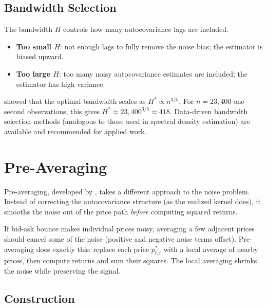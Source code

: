 \subsection{Bandwidth Selection}

The bandwidth $H$ controls how many autocovariance lags are included.
\begin{itemize}[nosep]
  \item \textbf{Too small $H$}: not enough lags to fully remove the noise bias; the estimator is biased upward.
  \item \textbf{Too large $H$}: too many noisy autocovariance estimates are included; the estimator has high variance.
\end{itemize}

\citet{BNHLS2008} showed that the optimal bandwidth scales as $H^* \propto n^{3/5}$.
For $n = 23{,}400$ one-second observations, this gives $H^* \approx 23{,}400^{3/5} \approx 418$.
Data-driven bandwidth selection methods (analogous to those used in spectral density estimation) are available and recommended for applied work.


\section{Pre-Averaging}
\label{sec:pre-averaging}

Pre-averaging, developed by \citet{JacodLiMyklandPodolskijVetter2009}, takes a different approach to the noise problem.
Instead of correcting the autocovariance structure (as the realized kernel does), it smooths the noise out of the price path \emph{before} computing squared returns.

\begin{intuition}
If bid-ask bounce makes individual prices noisy, averaging a few adjacent prices should cancel some of the noise (positive and negative noise terms offset).
Pre-averaging does exactly this: replace each price $p^*_{t,i}$ with a local average of nearby prices, then compute returns and sum their squares.
The local averaging shrinks the noise while preserving the signal.
\end{intuition}

\subsection{Construction}

